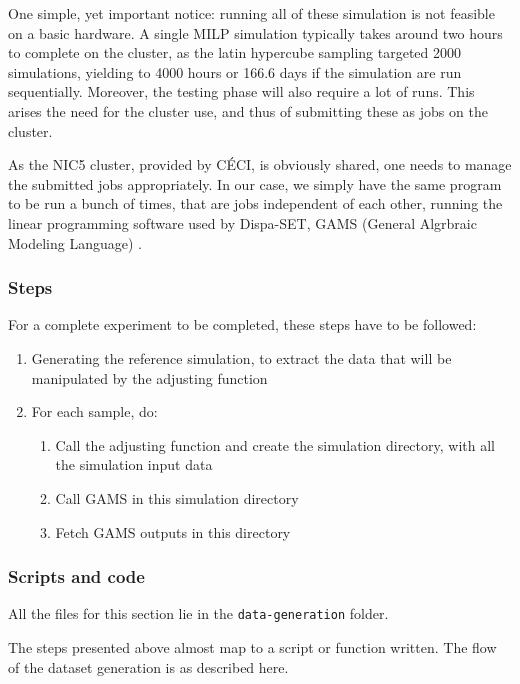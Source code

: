 One simple, yet important notice: running all of these simulation is not feasible on a basic hardware. A single MILP simulation typically takes around two hours to complete on the cluster, as the latin hypercube sampling targeted 2000 simulations, yielding to 4000 hours or 166.6 days if the simulation are run sequentially. Moreover, the testing phase will also require a lot of runs. This arises the need for the cluster use, and thus of submitting these as jobs on the cluster.

As the NIC5 cluster, provided by CÉCI, is obviously shared, one needs to manage the submitted jobs appropriately. In our case, we simply have the same program to be run a bunch of times, that are jobs independent of each other, running the linear programming software used by Dispa-SET, GAMS (General Algrbraic Modeling Language) \cite{GAMS}.

\subsubsection{Steps}
For a complete experiment to be completed, these steps have to be followed:
\begin{enumerate}
    \item Generating the reference simulation, to extract the data that will be manipulated by the adjusting function
    \item For each sample, do:
    \begin{enumerate}
        \item Call the adjusting function and create the simulation directory, with all the simulation input data
        \item Call GAMS in this simulation directory
        \item Fetch GAMS outputs in this directory
    \end{enumerate}
\end{enumerate}

\subsubsection{Scripts and code}

All the files for this section lie in the \texttt{data-generation} folder.

The steps presented above almost map to a script or function written. The flow of the dataset generation is as described here.

